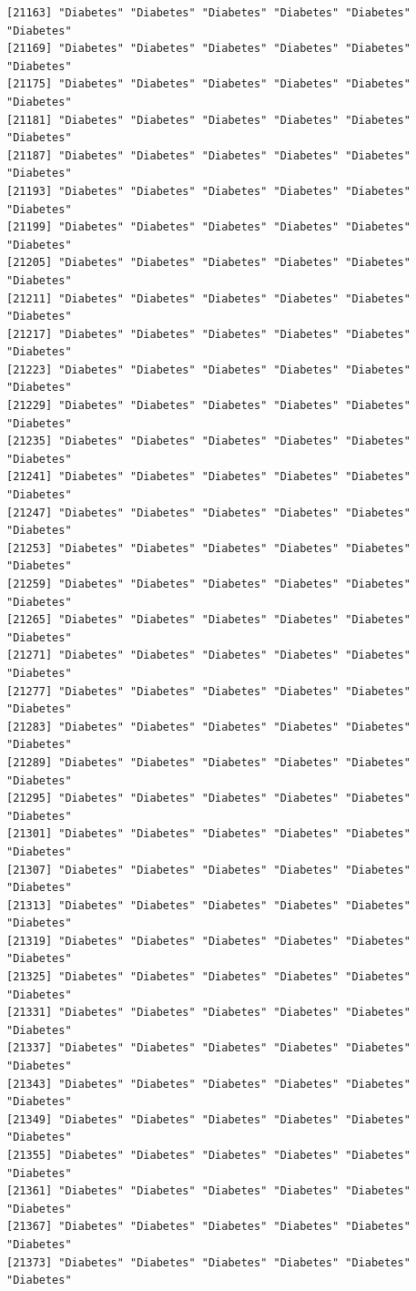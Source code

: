 \documentclass[
  letterpaper,
  DIV=11,
  numbers=noendperiod]{scrartcl}
\begin{document}
\begin{verbatim}
[21163] "Diabetes" "Diabetes" "Diabetes" "Diabetes" "Diabetes" "Diabetes"
[21169] "Diabetes" "Diabetes" "Diabetes" "Diabetes" "Diabetes" "Diabetes"
[21175] "Diabetes" "Diabetes" "Diabetes" "Diabetes" "Diabetes" "Diabetes"
[21181] "Diabetes" "Diabetes" "Diabetes" "Diabetes" "Diabetes" "Diabetes"
[21187] "Diabetes" "Diabetes" "Diabetes" "Diabetes" "Diabetes" "Diabetes"
[21193] "Diabetes" "Diabetes" "Diabetes" "Diabetes" "Diabetes" "Diabetes"
[21199] "Diabetes" "Diabetes" "Diabetes" "Diabetes" "Diabetes" "Diabetes"
[21205] "Diabetes" "Diabetes" "Diabetes" "Diabetes" "Diabetes" "Diabetes"
[21211] "Diabetes" "Diabetes" "Diabetes" "Diabetes" "Diabetes" "Diabetes"
[21217] "Diabetes" "Diabetes" "Diabetes" "Diabetes" "Diabetes" "Diabetes"
[21223] "Diabetes" "Diabetes" "Diabetes" "Diabetes" "Diabetes" "Diabetes"
[21229] "Diabetes" "Diabetes" "Diabetes" "Diabetes" "Diabetes" "Diabetes"
[21235] "Diabetes" "Diabetes" "Diabetes" "Diabetes" "Diabetes" "Diabetes"
[21241] "Diabetes" "Diabetes" "Diabetes" "Diabetes" "Diabetes" "Diabetes"
[21247] "Diabetes" "Diabetes" "Diabetes" "Diabetes" "Diabetes" "Diabetes"
[21253] "Diabetes" "Diabetes" "Diabetes" "Diabetes" "Diabetes" "Diabetes"
[21259] "Diabetes" "Diabetes" "Diabetes" "Diabetes" "Diabetes" "Diabetes"
[21265] "Diabetes" "Diabetes" "Diabetes" "Diabetes" "Diabetes" "Diabetes"
[21271] "Diabetes" "Diabetes" "Diabetes" "Diabetes" "Diabetes" "Diabetes"
[21277] "Diabetes" "Diabetes" "Diabetes" "Diabetes" "Diabetes" "Diabetes"
[21283] "Diabetes" "Diabetes" "Diabetes" "Diabetes" "Diabetes" "Diabetes"
[21289] "Diabetes" "Diabetes" "Diabetes" "Diabetes" "Diabetes" "Diabetes"
[21295] "Diabetes" "Diabetes" "Diabetes" "Diabetes" "Diabetes" "Diabetes"
[21301] "Diabetes" "Diabetes" "Diabetes" "Diabetes" "Diabetes" "Diabetes"
[21307] "Diabetes" "Diabetes" "Diabetes" "Diabetes" "Diabetes" "Diabetes"
[21313] "Diabetes" "Diabetes" "Diabetes" "Diabetes" "Diabetes" "Diabetes"
[21319] "Diabetes" "Diabetes" "Diabetes" "Diabetes" "Diabetes" "Diabetes"
[21325] "Diabetes" "Diabetes" "Diabetes" "Diabetes" "Diabetes" "Diabetes"
[21331] "Diabetes" "Diabetes" "Diabetes" "Diabetes" "Diabetes" "Diabetes"
[21337] "Diabetes" "Diabetes" "Diabetes" "Diabetes" "Diabetes" "Diabetes"
[21343] "Diabetes" "Diabetes" "Diabetes" "Diabetes" "Diabetes" "Diabetes"
[21349] "Diabetes" "Diabetes" "Diabetes" "Diabetes" "Diabetes" "Diabetes"
[21355] "Diabetes" "Diabetes" "Diabetes" "Diabetes" "Diabetes" "Diabetes"
[21361] "Diabetes" "Diabetes" "Diabetes" "Diabetes" "Diabetes" "Diabetes"
[21367] "Diabetes" "Diabetes" "Diabetes" "Diabetes" "Diabetes" "Diabetes"
[21373] "Diabetes" "Diabetes" "Diabetes" "Diabetes" "Diabetes" "Diabetes"

\end{verbatim}
\end{document}
